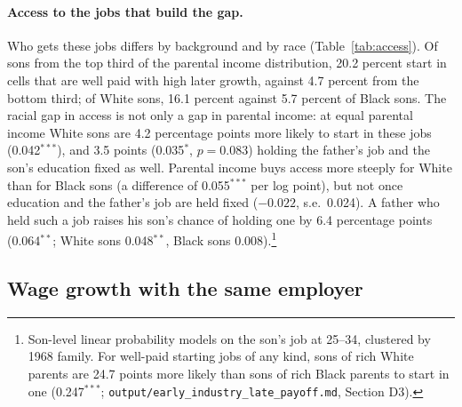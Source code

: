 

\paragraph{Access to the jobs that build the gap.} Who gets these jobs differs by background and by race
(Table~\ref{tab:access}). Of sons from the top third of the parental income distribution, 20.2 percent start in cells
that are well paid with high later growth, against 4.7 percent from the bottom third; of White sons, 16.1 percent
against 5.7 percent of Black sons. The racial gap in access is not only a gap in parental income: at equal parental
income White sons are 4.2 percentage points more likely to start in these jobs (0.042$^{***}$), and 3.5 points
(0.035$^{*}$, $p=0.083$) holding the father's job and the son's education fixed as well. Parental income buys access more
steeply for White than for Black sons (a difference of 0.055$^{***}$ per log point), but not once education and the
father's job are held fixed ($-0.022$, s.e.\ 0.024). A father who held such a job raises his son's chance of holding one
by 6.4 percentage points (0.064$^{**}$; White sons 0.048$^{**}$, Black sons 0.008).\footnote{Son-level linear probability
models on the son's job at 25--34, clustered by 1968 family. For well-paid starting jobs of any kind, sons of rich White
parents are 24.7 points more likely than sons of rich Black parents to start in one (0.247$^{***}$;
\texttt{output/early\_industry\_late\_payoff.md}, Section D3).}



\subsection{Wage growth with the same employer}

